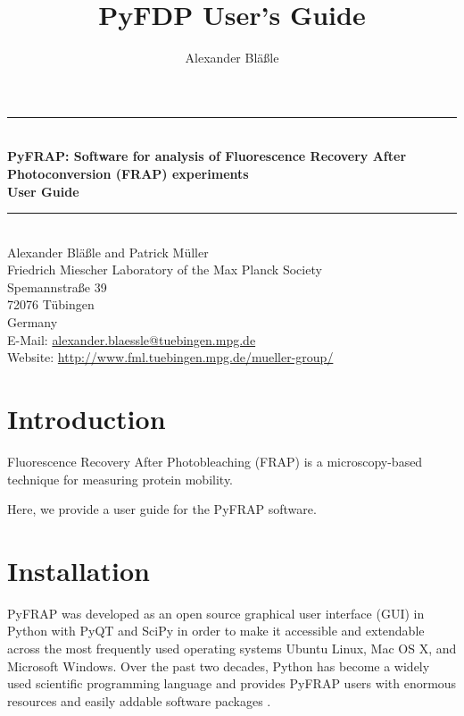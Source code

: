 \documentclass[a4paper,11pt]{article}
\title{PyFDP User's Guide}
\author{Alexander Bl\"a\ss le}
\newcommand{\HRule}{\rule{\linewidth}{0.5mm}}
\begin{document}
\begin{titlepage}
\begin{center}


\HRule \\[0.4cm]
{ \huge \bfseries PyFRAP: Software for analysis of Fluorescence Recovery After Photoconversion (FRAP) experiments\\[0.4cm] User Guide \\[0.4cm] }

\HRule \\[1.5cm]


\large
Alexander Bl\"a\ss le and Patrick M\"uller\\[0.5cm]


Friedrich Miescher Laboratory of the Max Planck Society\\
Spemannstra\ss e 39\\
72076 T\"ubingen\\
Germany\\[0.5cm]

E-Mail: \href{mailto:alexander.blaessle@tuebingen.mpg.de}{alexander.blaessle@tuebingen.mpg.de}\\
Website: \url{http://www.fml.tuebingen.mpg.de/mueller-group/}

\vfill

\end{center}
\end{titlepage}

\section{Introduction}

Fluorescence Recovery After Photobleaching (FRAP) is a microscopy-based technique for measuring protein mobility.

\noindent Here, we provide a user guide for the PyFRAP software. 
  
\section{Installation}

PyFRAP was developed as an open source graphical user interface (GUI) in Python with PyQT and SciPy in order to make it accessible and extendable across the most frequently used operating systems Ubuntu Linux, Mac OS X, and Microsoft Windows. Over the past two decades, Python has become a widely used scientific programming language and provides PyFRAP users with enormous resources and easily addable software packages \citep{Millman2011}. 
\end{document}
